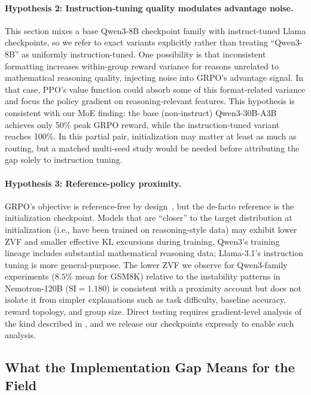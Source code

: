 \documentclass{article}
\begin{document}
\paragraph{Hypothesis 2: Instruction-tuning quality modulates advantage noise.}
This section mixes a base Qwen3-8B checkpoint family with instruct-tuned Llama
checkpoints, so we refer to exact variants explicitly rather than treating
``Qwen3-8B'' as uniformly instruction-tuned.
One possibility is that inconsistent formatting increases within-group reward
variance for reasons unrelated to mathematical reasoning quality, injecting
noise into GRPO's advantage signal. In that case, PPO's value function could
absorb some of this format-related variance and focus the policy gradient on
reasoning-relevant features.
This hypothesis is consistent with our MoE finding: the base (non-instruct)
Qwen3-30B-A3B achieves only 50\% peak GRPO reward, while the instruction-tuned
variant reaches 100\%. In this partial pair, initialization may matter at
least as much as routing, but a matched multi-seed study would be needed
before attributing the gap solely to instruction tuning.

\paragraph{Hypothesis 3: Reference-policy proximity.}
GRPO's objective is reference-free by design~\citep{shao2024deepseekmath},
but the de-facto reference is the initialization checkpoint.
Models that are ``closer'' to the target distribution at initialization (i.e.,
have been trained on reasoning-style data) may exhibit lower ZVF and smaller
effective KL excursions during training.
Qwen3's training lineage includes substantial mathematical reasoning data;
Llama-3.1's instruction tuning is more general-purpose.
The lower ZVF we observe for Qwen3-family experiments ($8.5\%$ mean for GSM8K)
relative to the instability patterns in Nemotron-120B ($\text{SI} = 1.180$)
is consistent with a proximity account but does not isolate it from simpler
explanations such as task difficulty, baseline accuracy, reward topology, and
group size.
Direct testing requires gradient-level analysis of the kind described in
\citet{liu2025rlsubnetworks}, and we release our checkpoints expressly to
enable such analysis.

\subsection{What the Implementation Gap Means for the Field}
\label{sec:discuss_impl}
\end{document}
